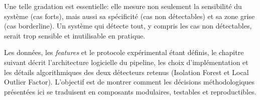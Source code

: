 Une telle gradation est essentielle: elle mesure non seulement la sensibilité du
système (cas forts), mais aussi sa spécificité (cas non détectables) et sa zone grise
(cas borderline). Un système qui détecte tout, y compris les cas non détectables, serait
trop sensible et inutilisable en pratique.

\vspace{0.5em}
\noindent
Les données, les \textit{features} et le protocole expérimental étant définis, le chapitre suivant
décrit l'architecture logicielle du pipeline, les choix d'implémentation et les détails
algorithmiques des deux détecteurs retenus (Isolation Forest et Local Outlier Factor).
L'objectif est de montrer comment les décisions méthodologiques présentées ici se traduisent
en composants modulaires, testables et reproductibles.
